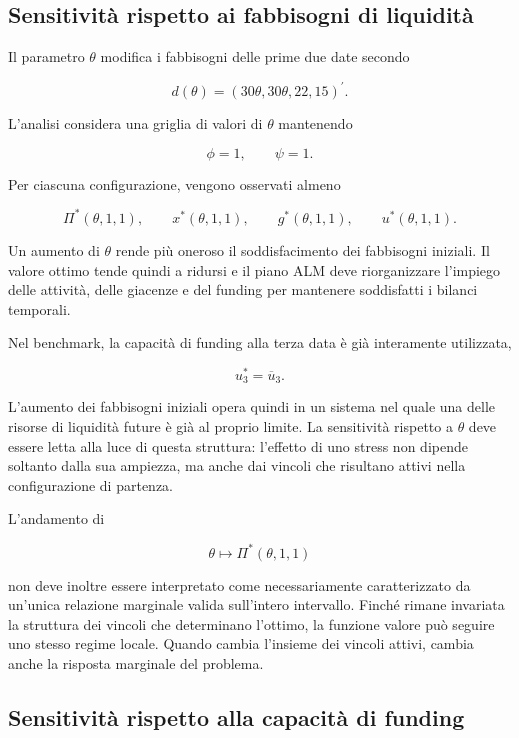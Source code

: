 \subsection{Sensitivit\`a rispetto ai fabbisogni di liquidit\`a}

Il parametro $\theta$ modifica i fabbisogni delle prime due date secondo

\[
d(\theta)
=
\left(
30\theta,
30\theta,
22,
15
\right)^{\prime}.
\]

L'analisi considera una griglia di valori di $\theta$ mantenendo

\[
\phi=1,
\qquad
\psi=1.
\]

Per ciascuna configurazione, vengono osservati almeno

\[
\Pi^*(\theta,1,1),
\qquad
x^*(\theta,1,1),
\qquad
g^*(\theta,1,1),
\qquad
u^*(\theta,1,1).
\]

Un aumento di $\theta$ rende pi\`u oneroso il soddisfacimento dei fabbisogni
iniziali. Il valore ottimo tende quindi a ridursi e il piano ALM deve
riorganizzare l'impiego delle attivit\`a, delle giacenze e del funding per
mantenere soddisfatti i bilanci temporali.

Nel benchmark, la capacit\`a di funding alla terza data \`e gi\`a interamente
utilizzata,

\[
u_3^*=\overline{u}_3.
\]

L'aumento dei fabbisogni iniziali opera quindi in un sistema nel quale una
delle risorse di liquidit\`a future \`e gi\`a al proprio limite. La
sensitivit\`a rispetto a $\theta$ deve essere letta alla luce di questa
struttura: l'effetto di uno stress non dipende soltanto dalla sua ampiezza,
ma anche dai vincoli che risultano attivi nella configurazione di partenza.

L'andamento di

\[
\theta
\longmapsto
\Pi^*(\theta,1,1)
\]

\noindent non deve inoltre essere interpretato come necessariamente caratterizzato da
un'unica relazione marginale valida sull'intero intervallo. Finch\'e rimane
invariata la struttura dei vincoli che determinano l'ottimo, la funzione
valore pu\`o seguire uno stesso regime locale. Quando cambia l'insieme dei
vincoli attivi, cambia anche la risposta marginale del problema.

\subsection{Sensitivit\`a rispetto alla capacit\`a di funding}

